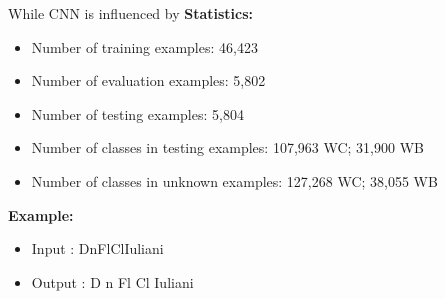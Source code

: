 \documentclass{jdmdh}
\begin{document}
While CNN is influenced by
\textbf{Statistics:}

\begin{itemize}
\item Number of training examples: 46,423
\item Number of evaluation examples: 5,802
\item Number of testing examples: 5,804
\item Number of classes in testing examples: 107,963 WC; 31,900 WB
\item Number of classes in unknown examples: 127,268 WC; 38,055 WB
\end{itemize}

\textbf{Example:}

\begin{itemize}
    \item Input : DnFlClIuliani
    \item Output : D n Fl Cl Iuliani
\end{itemize}
\end{document}
